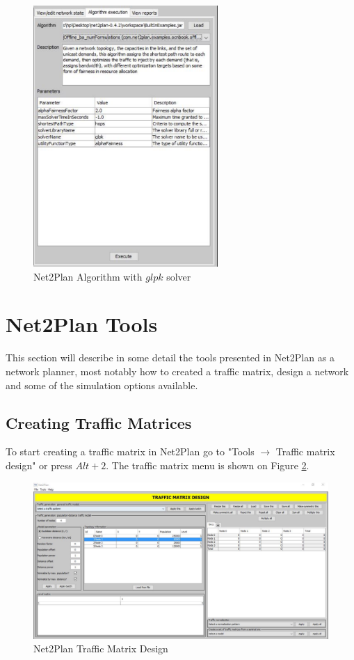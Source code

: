 		
	\begin{figure}[h!]
		\centering
		\includegraphics[width = 7cm]{Net2Plan_glpk.pdf}
		\caption{Net2Plan Algorithm with $glpk$ solver}
		\label{Net2Plan_glpk}
	\end{figure}		
		   	
    \newpage

\section{Net2Plan Tools}
This section will describe in some detail the tools presented in Net2Plan as a network planner, most notably how to created a traffic matrix, design a network and some of the simulation options available.

	\subsection{Creating Traffic Matrices}
    To start creating a traffic matrix in Net2Plan go to "Tools $\rightarrow$ Traffic matrix design" or press $Alt+2$. The traffic matrix menu is shown on Figure \ref{Net2Plan_traffic}.
	
	\begin{figure}[h!]
		\vspace{-0.3cm}
		\centering	
		\includegraphics[width = 16cm]{Net2Plan_traffic.pdf}
		\caption{Net2Plan Traffic Matrix Design}
		\label{Net2Plan_traffic}
	\end{figure}
		
